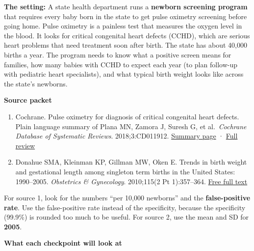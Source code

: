\documentclass[
  letterpaper,
  DIV=11,
  numbers=noendperiod]{scrartcl}
\providecommand{\tightlist}{%
  \setlength{\itemsep}{0pt}\setlength{\parskip}{0pt}}
\begin{document}
\textbf{The setting:} A state health department runs a \textbf{newborn
screening program} that requires every baby born in the state to get
pulse oximetry screening before going home. Pulse oximetry is a painless
test that measures the oxygen level in the blood. It looks for critical
congenital heart defects (CCHD), which are serious heart problems that
need treatment soon after birth. The state has about 40,000 births a
year. The program needs to know what a positive screen means for
families, how many babies with CCHD to expect each year (to plan
follow-up with pediatric heart specialists), and what typical birth
weight looks like across the state's newborns.

\textbf{Source packet}

\begin{enumerate}
\def\labelenumi{\arabic{enumi}.}
\tightlist
\item
  Cochrane. Pulse oximetry for diagnosis of critical congenital heart
  defects. Plain language summary of Plana MN, Zamora J, Suresh G, et
  al.~\emph{Cochrane Database of Systematic Reviews}. 2018;3:CD011912.
  \href{https://www.cochrane.org/CD011912/NEONATAL_pulse-oximetry-diagnosis-critical-congenital-heart-defects}{Summary
  page} ·
  \href{https://www.cochranelibrary.com/cdsr/doi/10.1002/14651858.CD011912.pub2/full}{Full
  review}
\item
  Donahue SMA, Kleinman KP, Gillman MW, Oken E. Trends in birth weight
  and gestational length among singleton term births in the United
  States: 1990--2005. \emph{Obstetrics \& Gynecology}. 2010;115(2 Pt
  1):357--364.
  \href{https://pmc.ncbi.nlm.nih.gov/articles/PMC3219436/}{Free full
  text}
\end{enumerate}

For source 1, look for the numbers ``per 10,000 newborns'' and the
\textbf{false-positive rate}. Use the false-positive rate instead of the
specificity, because the specificity (99.9\%) is rounded too much to be
useful. For source 2, use the mean and SD for \textbf{2005}.

\textbf{What each checkpoint will look at}
\end{document}
